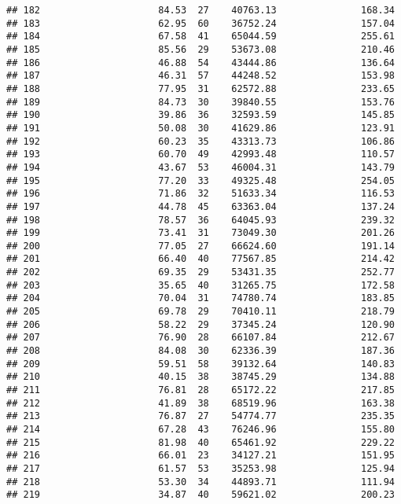 \documentclass[
]{article}
\begin{document}
\begin{verbatim}
## 182                     84.53  27    40763.13               168.34
## 183                     62.95  60    36752.24               157.04
## 184                     67.58  41    65044.59               255.61
## 185                     85.56  29    53673.08               210.46
## 186                     46.88  54    43444.86               136.64
## 187                     46.31  57    44248.52               153.98
## 188                     77.95  31    62572.88               233.65
## 189                     84.73  30    39840.55               153.76
## 190                     39.86  36    32593.59               145.85
## 191                     50.08  30    41629.86               123.91
## 192                     60.23  35    43313.73               106.86
## 193                     60.70  49    42993.48               110.57
## 194                     43.67  53    46004.31               143.79
## 195                     77.20  33    49325.48               254.05
## 196                     71.86  32    51633.34               116.53
## 197                     44.78  45    63363.04               137.24
## 198                     78.57  36    64045.93               239.32
## 199                     73.41  31    73049.30               201.26
## 200                     77.05  27    66624.60               191.14
## 201                     66.40  40    77567.85               214.42
## 202                     69.35  29    53431.35               252.77
## 203                     35.65  40    31265.75               172.58
## 204                     70.04  31    74780.74               183.85
## 205                     69.78  29    70410.11               218.79
## 206                     58.22  29    37345.24               120.90
## 207                     76.90  28    66107.84               212.67
## 208                     84.08  30    62336.39               187.36
## 209                     59.51  58    39132.64               140.83
## 210                     40.15  38    38745.29               134.88
## 211                     76.81  28    65172.22               217.85
## 212                     41.89  38    68519.96               163.38
## 213                     76.87  27    54774.77               235.35
## 214                     67.28  43    76246.96               155.80
## 215                     81.98  40    65461.92               229.22
## 216                     66.01  23    34127.21               151.95
## 217                     61.57  53    35253.98               125.94
## 218                     53.30  34    44893.71               111.94
## 219                     34.87  40    59621.02               200.23

\end{verbatim}
\end{document}
